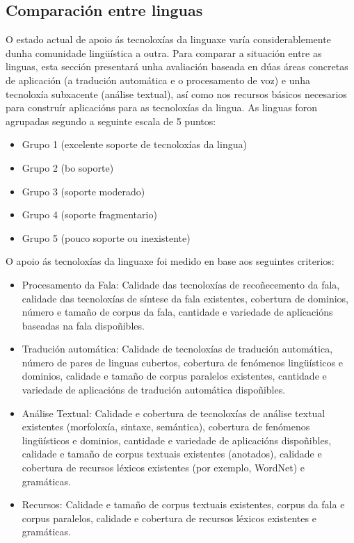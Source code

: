 \begin{multicols}{2}
\subsection{Comparación entre linguas}
   O estado actual de apoio ás tecnoloxías da linguaxe varía considerablemente dunha comunidade lingüística a outra. Para comparar a situación entre as linguas, esta sección presentará unha avaliación baseada en dúas áreas concretas de aplicación (a tradución automática e o procesamento de voz) e unha tecnoloxía subxacente (análise textual), así como nos recursos básicos necesarios para construír aplicacións para as tecnoloxías da lingua. As linguas foron agrupadas segundo a seguinte escala de 5 puntos:
\begin{itemize}
\item Grupo 1 (excelente soporte de tecnoloxías da lingua)
\item Grupo 2 (bo soporte)
\item Grupo 3 (soporte moderado)
\item Grupo 4 (soporte fragmentario)
\item Grupo 5 (pouco soporte ou inexistente)
\end{itemize}
O apoio ás tecnoloxías da linguaxe foi medido en base aos seguintes criterios:
\begin{itemize}
\item Procesamento da Fala: Calidade das tecnoloxías de recoñecemento da fala, calidade das tecnoloxías de síntese da fala existentes, cobertura de dominios, número e tamaño de corpus da fala, cantidade e variedade de aplicacións baseadas na fala dispoñibles.
\item Tradución automática: Calidade de tecnoloxías de tradución automática, número de pares de linguas cubertos, cobertura de fenómenos lingüísticos e dominios, calidade e tamaño de corpus paralelos existentes, cantidade e variedade de aplicacións de tradución automática dispoñibles.
\item Análise Textual: Calidade e cobertura de tecnoloxías de análise textual existentes (morfoloxía, sintaxe, semántica), cobertura de fenómenos lingüísticos e dominios, cantidade e variedade de aplicacións dispoñibles, calidade e tamaño de corpus textuais existentes (anotados), calidade e cobertura de recursos léxicos existentes (por exemplo, WordNet) e gramáticas.
\item Recursos: Calidade e tamaño de corpus textuais existentes, corpus da fala e corpus paralelos, calidade e cobertura de recursos léxicos existentes e gramáticas.


\end{itemize}
\end{multicols}
